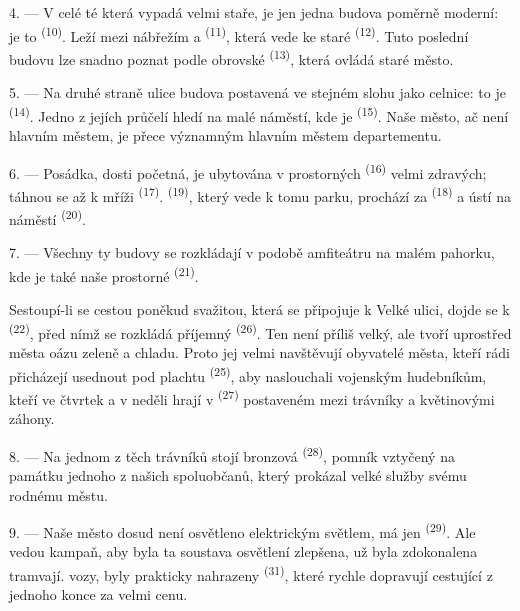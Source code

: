 4. --- V celé té  která vypadá velmi staře, je jen jedna budova poměrně
moderní: je to  \textsuperscript{(10)}. Leží mezi nábřežím a
 \textsuperscript{(11)}, která vede ke staré 
\textsuperscript{(12)}. Tuto poslední budovu lze snadno poznat podle obrovské
 \textsuperscript{(13)}, která ovládá staré město.

5. --- Na druhé straně ulice  budova postavená ve stejném slohu jako
celnice: to je  \textsuperscript{(14)}. Jedno z jejích průčelí hledí na
malé náměstí, kde je  \textsuperscript{(15)}. Naše město, ač není
hlavním městem, je přece významným hlavním městem departementu.

\VUsaut{5.0mm}
\VUsaut{3.4mm}

6. --- Posádka, dosti početná, je ubytována v prostorných 
\textsuperscript{(16)} velmi zdravých; táhnou se až k mříži 
\textsuperscript{(17)}.  \textsuperscript{(19)}, který vede k tomu
parku, prochází za  \textsuperscript{(18)} a ústí na náměstí
 \textsuperscript{(20)}.

7. --- Všechny ty budovy se rozkládají v podobě amfiteátru na malém pahorku, kde je
také naše prostorné  \textsuperscript{(21)}.

Sestoupí-li se cestou poněkud svažitou, která se připojuje k Velké ulici, dojde se k
 \textsuperscript{(22)}, před nímž se rozkládá příjemný  \textsuperscript{(26)}. Ten  není příliš velký, ale tvoří
uprostřed města oázu zeleně a chladu. Proto jej velmi navštěvují obyvatelé města,
kteří rádi přicházejí usednout pod plachtu  \textsuperscript{(25)},
aby naslouchali vojenským hudebníkům, kteří ve čtvrtek a v neděli hrají v
 \textsuperscript{(27)} postaveném mezi trávníky a květinovými záhony.

8. --- Na jednom z těch trávníků stojí bronzová 
\textsuperscript{(28)}, pomník vztyčený na památku jednoho z našich spoluobčanů, který
prokázal velké služby svému rodnému městu.

\VUsaut{4.0mm}
\VUsaut{3.4mm}

9. --- Naše město dosud není osvětleno elektrickým světlem, má jen  \textsuperscript{(29)}. Ale  vedou kampaň, aby byla ta
soustava osvětlení zlepšena,  už byla zdokonalena  tramvají.  vozy,   byly prakticky
nahrazeny  \textsuperscript{(31)}, které rychle
dopravují cestující z jednoho konce  za velmi 
cenu.

